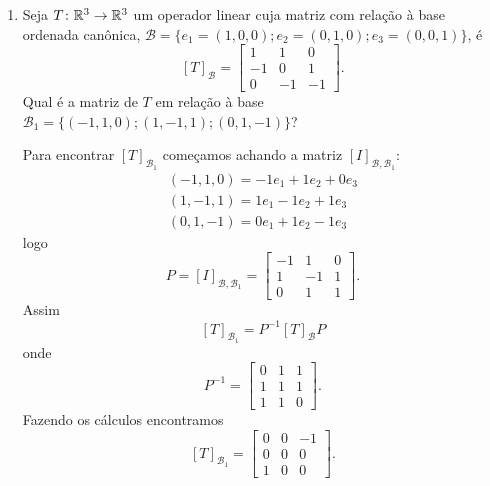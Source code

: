 \begin{exemplos}
\begin{enumerate}[label={\arabic*})]
  \item Seja $T \colon \mathbb{R}^3 \to \mathbb{R}^3$ um operador linear cuja matriz com relação à base ordenada canônica, $\mathcal{B} = \{e_1 = (1, 0, 0); e_2 = (0, 1, 0); e_3 = (0, 0 ,1)\}$, é
    \[
      [T]_\mathcal{B} = \begin{bmatrix}1 & 1 & 0\\-1 & 0 & 1\\0 & -1 & -1\end{bmatrix}.
    \]
    Qual é a matriz de $T$ em relação à base $\mathcal{B}_1 = \{(-1, 1, 0); (1, -1, 1); (0, 1, -1)\}$?
    \begin{solucao}
      Para encontrar $[T]_{\mathcal{B}_1}$ começamos achando a matriz $[I]_{\mathcal{B}, \mathcal{B}_1}$:
      \begin{align*}
        (-1, 1, 0) = -1e_1 + 1e_2 + 0e_3\\
        (1, -1, 1) = 1e_1 - 1e_2 + 1e_3\\
        (0, 1, -1) = 0e_1 + 1e_2 - 1e_3
      \end{align*}
      logo
      \[
        P = [I]_{\mathcal{B}, \mathcal{B}_1} = \begin{bmatrix}-1 & 1 & 0\\1 & -1 & 1\\0 & 1 & 1\end{bmatrix}.
      \]
      Assim
      \[
        [T]_{\mathcal{B}_1} = P^{-1}[T]_\mathcal{B}P
      \]
      onde
      \[
        P^{-1} = \begin{bmatrix}0 & 1 & 1\\1 & 1 & 1\\1 & 1 & 0\end{bmatrix}.
      \]
      Fazendo os cálculos encontramos
      \[
        [T]_{\mathcal{B}_1} = \begin{bmatrix}0 & 0 & -1\\0 & 0 & 0\\1 & 0 & 0\end{bmatrix}.
      \]
    \end{solucao}


\end{enumerate}
\end{exemplos}
